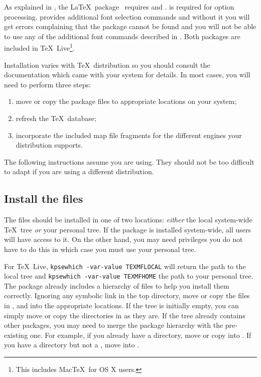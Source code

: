 \documentclass[11pt,british]{article}
\begin{document}
As explained in , the \LaTeX\ package \ requires  and .  is required for option processing.  provides additional font selection commands and without it you will get errors complaining that the package cannot be found and you will not be able to use any of the additional font commands described in . Both packages are included in \TeX~Live\footnote{This includes Mac\TeX\ for OS X users.}.

Installation varies with \TeX\ distribution so you should consult the documentation which came with your system for details. In most cases, you will need to perform three steps:
		\begin{enumerate}
			\item move or copy the package files to appropriate locations on your system;
			\item refresh the \TeX\ database;
			\item incorporate the included map file fragments for the different engines your distribution supports.
		\end{enumerate}

The following instructions assume you are using. They should not be too difficult to adapt if you are using a different distribution.

\subsection{Install the files}

The files should be installed in one of two locations: \emph{either} the local system-wide \TeX\ tree \emph{or} your personal tree. If the package is installed system-wide, all users will have access to it. On the other hand, you may need privileges you do not have to do this in which case you must use your personal tree.

For \TeX~Live, \verb|kpsewhich -var-value TEXMFLOCAL| will return the path to the local tree and \verb|kpsewhich -var-value TEXMFHOME| the path to your personal tree. The package already includes a hierarchy of files to help you install them correctly. Ignoring any symbolic link in the top directory, move or copy the files in ,  and  into the appropriate locations. If the tree is initially empty, you can simply move or copy the directories in as they are. If the tree already contains other packages, you may need to merge the package hierarchy with the pre-existing one. For example, if you already have a  directory, move or copy  into . If you have a  directory but not a , move  into .
\end{document}
